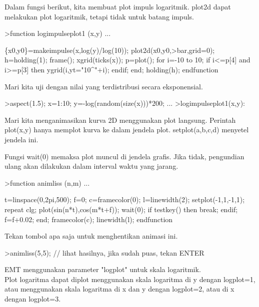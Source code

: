 \documentclass{article}
\begin{document}
\begin{eulernotebook}
\begin{eulercomment}
\begin{eulercomment}
\begin{eulercomment}
\begin{eulercomment}
\begin{eulercomment}
\begin{eulercomment}
\begin{eulercomment}
Dalam fungsi berikut, kita membuat plot impuls logaritmik. plot2d
dapat melakukan plot logaritmik, tetapi tidak untuk batang impuls.
\end{eulercomment}
\begin{eulerprompt}
>function logimpulseplot1 (x,y) ...
\end{eulerprompt}
\begin{eulerudf}
    \{x0,y0\}=makeimpulse(x,log(y)/log(10));
    plot2d(x0,y0,>bar,grid=0);
    h=holding(1);
    frame();
    xgrid(ticks(x));
    p=plot();
    for i=-10 to 10;
      if i<=p[4] and i>=p[3] then
         ygrid(i,yt="10^"+i);
      endif;
    end;
    holding(h);
  endfunction
\end{eulerudf}
\begin{eulercomment}
Mari kita uji dengan nilai yang terdistribusi secara eksponensial.
\end{eulercomment}
\begin{eulerprompt}
>aspect(1.5); x=1:10; y=-log(random(size(x)))*200; ...
>logimpulseplot1(x,y):
\end{eulerprompt}
\begin{eulercomment}
Mari kita menganimasikan kurva 2D menggunakan plot langsung. Perintah
plot(x,y) hanya memplot kurva ke dalam jendela plot. setplot(a,b,c,d)
menyetel jendela ini.

Fungsi wait(0) memaksa plot muncul di jendela grafis. Jika tidak,
pengundian ulang akan dilakukan dalam interval waktu yang jarang.
\end{eulercomment}
\begin{eulerprompt}
>function animliss (n,m) ...
\end{eulerprompt}
\begin{eulerudf}
  t=linspace(0,2pi,500);
  f=0;
  c=framecolor(0);
  l=linewidth(2);
  setplot(-1,1,-1,1);
  repeat
    clg;
    plot(sin(n*t),cos(m*t+f));
    wait(0);
    if testkey() then break; endif;
    f=f+0.02;
  end;
  framecolor(c);
  linewidth(l);
  endfunction
\end{eulerudf}
\begin{eulercomment}
Tekan tombol apa saja untuk menghentikan animasi ini.
\end{eulercomment}
\begin{eulerprompt}
>animliss(5,5); // lihat hasilnya, jika sudah puas, tekan ENTER
\end{eulerprompt}
\begin{eulercomment}
EMT menggunakan parameter "logplot" untuk skala logaritmik.\\
Plot logaritma dapat diplot menggunakan skala logaritma di y dengan
logplot=1, atau menggunakan skala logaritma di x dan y dengan
logplot=2, atau di x dengan logplot=3.


\end{eulercomment}
\end{eulercomment}
\end{eulercomment}
\end{eulercomment}
\end{eulercomment}
\end{eulercomment}
\end{eulercomment}
\end{eulernotebook}
\end{document}
